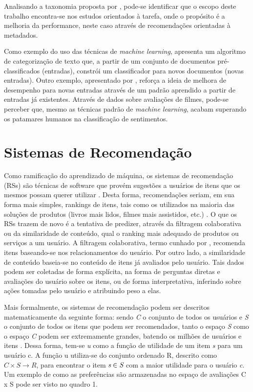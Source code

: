 \documentclass[12pt, openright, oneside, a4paper, brazil]{abntex2}
\begin{document}
Analisando a taxonomia proposta por , pode-se identificar que o escopo deste trabalho encontra-se nos estudos orientados à tarefa, onde o propósito é a melhoria da performance, neste caso através de recomendações orientadas à metadados.

Como exemplo do uso das técnicas de \textit{machine learning},   apresenta um algoritmo de categorização de texto que, a partir de um conjunto de documentos pré-classificados (entradas), constrói um classificador para novos documentos (novas entradas). Outro exemplo, apresentado por , reforça a ideia de melhora de desempenho para novas entradas através de um padrão aprendido a partir de entradas já existentes. Através de dados sobre avaliações de filmes, pode-se perceber que, mesmo as técnicas padrão de \textit{machine learning}, acabam superando os patamares humanos na classificação de sentimentos.

\section{Sistemas de Recomendação} \label{recommender_systems}

Como ramificação do aprendizado de máquina, os sistemas de recomendação (RSs) são técnicas de software que provém sugestões a usuários de itens que os mesmos possam querer utilizar \cite{resnick1997recommender, schafer1999recommender}. Desta forma, recomendações seriam, em sua forma mais simples, rankings de itens, tais como os utilizados na maioria das soluções de produtos (livros mais lidos, filmes mais assistidos, etc.) \cite{ricci2011introduction}. O que os RSs trazem de novo é a tentativa de predizer, através da filtragem colaborativa ou da similaridade de conteúdo, qual o ranking mais adequado de produtos ou serviços a um usuário. A filtragem colaborativa, termo cunhado por , recomenda itens baseando-se nos relacionamentos do usuário. Por outro lado, a similaridade de conteúdo baseia-se no conteúdo de itens já avaliados pelo usuário. Tais dados podem ser coletadas de forma explícita, na forma de perguntas diretas e avaliações do usuário sobre os itens, ou de forma interpretativa, inferindo sobre ações tomadas pelo usuário e atribuindo peso a elas.

Mais formalmente, os sistemas de recomendação podem ser descritos matematicamente da seguinte forma: sendo \emph{C} o conjunto de todos os usuários e \emph{S} o conjunto de todos os itens que podem ser recomendados, tanto o espaço \emph{S} como o espaço \emph{C} podem ser extremamente grandes, batendo os milhões de usuários e itens \cite{adomavicius2005toward, gomez2016netflix}. Dessa forma, tem-se \textit{u} como a função de utilidade de um item \emph{s} para um usuário c. A função u utiliza-se do conjunto ordenado R, descrito como $C \times S \rightarrow R$, para encontrar o item $\emph{s} \in \emph{S}$ com a maior utilidade para o usuário \emph{c}. Um exemplo de como as preferências são armazenadas no espaço de avaliações C x S pode ser visto no quadro 1.
\end{document}
